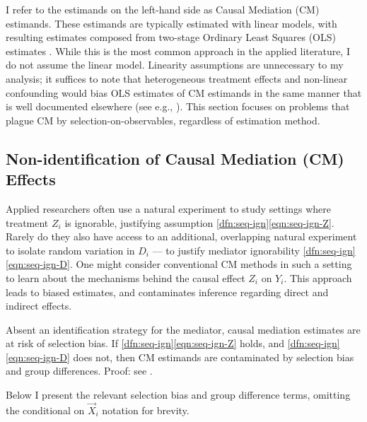 I refer to the estimands on the left-hand side as Causal Mediation (CM) estimands.
These estimands are typically estimated with linear models, with resulting estimates composed from two-stage Ordinary Least Squares (OLS) estimates \citep{imai2010identification}.
While this is the most common approach in the applied literature, I do not assume the linear model.
Linearity assumptions are unnecessary to my analysis; it suffices to note that heterogeneous treatment effects and non-linear confounding would bias OLS estimates of CM estimands in the same manner that is well documented elsewhere (see e.g., \citealt{angrist1998estimating,sloczynski2022interpreting}).
This section focuses on problems that plague CM by selection-on-observables, regardless of estimation method.

\subsection{Non-identification of Causal Mediation (CM) Effects}
Applied researchers often use a natural experiment to study settings where treatment $Z_i$ is ignorable, justifying assumption \ref{dfn:seq-ign}\eqref{eqn:seq-ign-Z}.
Rarely do they also have access to an additional, overlapping natural experiment to isolate random variation in $D_i$ --- to justify mediator ignorability \ref{dfn:seq-ign}\eqref{eqn:seq-ign-D}.
One might consider conventional CM methods in such a setting to learn about the mechanisms behind the causal effect $Z_i$ on $Y_i$.
This approach leads to biased estimates, and contaminates inference regarding direct and indirect effects.

\begin{theorem}
    \label{thm:selection-bias}
    Absent an identification strategy for the mediator, causal mediation estimates are at risk of selection bias.
    If \ref{dfn:seq-ign}\eqref{eqn:seq-ign-Z} holds, and \ref{dfn:seq-ign}\eqref{eqn:seq-ign-D} does not, then CM estimands are contaminated by selection bias and group differences.
    Proof: see .
\end{theorem}
Below I present the relevant selection bias and group difference terms, omitting the conditional on $\vec X_i$ notation for brevity.

